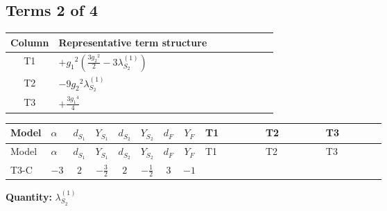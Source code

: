 \documentclass[8pt]{article}
\begin{document}
\begin{landscape}
\subsection*{Terms 2 of 4}
\begin{center}
\begin{tabular}{@{}c >{\raggedright\arraybackslash}p{0.82\linewidth}@{}}
\toprule
Column & Representative term structure \\
\midrule
T1 & \(\displaystyle +{g_1}^2 \left(\frac{3 {g_2}^2}{2}-3 {\lambda_{S_2}^{(1)}}\right)\) \\
\midrule
T2 & \(\displaystyle -9 {g_2}^2 {\lambda_{S_2}^{(1)}}\) \\
\midrule
T3 & \(\displaystyle +\frac{3 {g_1}^4}{4}\) \\
\midrule
\bottomrule
\end{tabular}
\end{center}
\smallskip
\tiny
\begin{longtable}{@{}llcccccc >{\raggedright\arraybackslash}p{0.21\linewidth} >{\raggedright\arraybackslash}p{0.21\linewidth} >{\raggedright\arraybackslash}p{0.21\linewidth}@{}}
\toprule
Model & $\alpha$ & $d_{S_1}$ & $Y_{S_1}$ & $d_{S_2}$ & $Y_{S_2}$ & $d_F$ & $Y_F$ & T1 & T2 & T3 \\
\midrule
\endfirsthead
\toprule
Model & $\alpha$ & $d_{S_1}$ & $Y_{S_1}$ & $d_{S_2}$ & $Y_{S_2}$ & $d_F$ & $Y_F$ & T1 & T2 & T3 \\
\midrule
\endhead
T3-C & $-3$ & $2$ & $-\frac{3}{2}$ & $2$ & $-\frac{1}{2}$ & $3$ & $-1$ & \scriptsize\adjustbox{max width=\linewidth}{$\begin{gathered} +{g_1}^2 \left(\frac{3 {g_2}^2}{2}-3 {\lambda_{S_2}^{(1)}}\right)\end{gathered}$} & \scriptsize\adjustbox{max width=\linewidth}{$\begin{gathered} -9 {g_2}^2 {\lambda_{S_2}^{(1)}}\end{gathered}$} & \scriptsize\adjustbox{max width=\linewidth}{$\begin{gathered} +\frac{3 {g_1}^4}{4}\end{gathered}$} \\
\midrule
\bottomrule
\end{longtable}
\clearpage
\noindent\textbf{Quantity: }$\lambda_{S_2}^{(1)}$\par\smallskip

\end{landscape}
\end{document}
